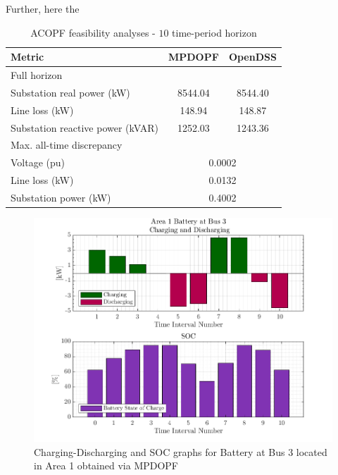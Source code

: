 \documentclass[../../outputs/main.tex]{subfiles}
\begin{document}
Further, here the 

\begin{table}[h!]
    \centering
    \caption{ACOPF feasibility analyses - $10$ time-period horizon}
    \begin{tabular}{|l|c|c|}
    \hline
    \textbf{Metric} & \textbf{MPDOPF} & \textbf{OpenDSS} \\ \hline
    Full horizon  & \multicolumn{2}{c|}{} \\ \hline
    \quad Substation real power (kW) & 8544.04 & 8544.40 \\ \hline
    \quad Line loss (kW) & 148.94 & 148.87 \\ \hline
    \quad Substation reactive power (kVAR) & 1252.03 & 1243.36 \\ \hline
    Max. all-time discrepancy & \multicolumn{2}{c|}{} \\ \hline
    \quad Voltage (pu) & \multicolumn{2}{c|}{0.0002} \\ \hline
    \quad Line loss (kW) & \multicolumn{2}{c|}{0.0132} \\ \hline
    \quad Substation power (kW) & \multicolumn{2}{c|}{0.4002} \\ \hline
    \end{tabular}
    \label{table:feas-copf-10-20-30}
\end{table}

\begin{figure}[h!]
    \centering
    \includegraphics[width=\linewidth]{../figures/T10-pv20-batt30-genCost/dopf/BatteryPlots/macroItr_5_genCost_Battery_1_alpha_0.001.png}
    \caption{Charging-Discharging and SOC graphs for Battery at Bus 3 located in Area 1 obtained via MPDOPF}
    \label{fig:batt-plot-dopf-10-20-30-genCost}
\end{figure}
\end{document}

